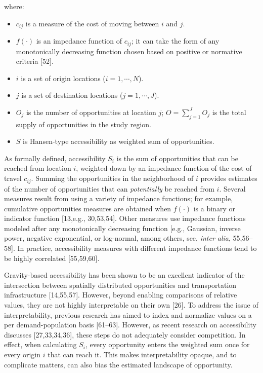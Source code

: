 \documentclass[10pt,letterpaper]{article}
\providecommand{\tightlist}{%
  \setlength{\itemsep}{0pt}\setlength{\parskip}{0pt}}
\begin{document}
\noindent where:

\begin{itemize}
\tightlist
\item
  \(c_{ij}\) is a measure of the cost of moving between \(i\) and \(j\).
\item
  \(f(\cdot)\) is an impedance function of \(c_{ij}\); it can take the
  form of any monotonically decreasing function chosen based on positive
  or normative criteria {[}52{]}.
\item
  \(i\) is a set of origin locations (\(i = 1,\cdots,N\)).
\item
  \(j\) is a set of destination locations (\(j = 1,\cdots,J\)).
\item
  \(O_j\) is the number of opportunities at location \(j\);
  \(O = \sum_{j=1}^J O_j\) is the total supply of opportunities in the
  study region.
\item
  \(S\) is Hansen-type accessibility as weighted sum of opportunities.
\end{itemize}

As formally defined, accessibility \(S_i\) is the sum of opportunities
that can be reached from location \(i\), weighted down by an impedance
function of the cost of travel \(c_{ij}\). Summing the opportunities in
the neighborhood of \(i\) provides estimates of the number of
opportunities that can \emph{potentially} be reached from \(i\). Several
measures result from using a variety of impedance functions; for
example, cumulative opportunities measures are obtained when
\(f(\cdot)\) is a binary or indicator function {[}13,e.g., 30,53,54{]}.
Other measures use impedance functions modeled after any monotonically
decreasing function {[}e.g., Gaussian, inverse power, negative
exponential, or log-normal, among others, see, \emph{inter alia},
55,56--58{]}. In practice, accessibility measures with different
impedance functions tend to be highly correlated {[}55,59,60{]}.

Gravity-based accessibility has been shown to be an excellent indicator
of the intersection between spatially distributed opportunities and
transportation infrastructure {[}14,55,57{]}. However, beyond enabling
comparisons of relative values, they are not highly interpretable on
their own {[}26{]}. To address the issue of interpretability, previous
research has aimed to index and normalize values on a per
demand-population basis {[}61--63{]}. However, as recent research on
accessibility discusses {[}27,33,34,36{]}, these steps do not adequately
consider competition. In effect, when calculating \(S_i\), every
opportunity enters the weighted sum once for every origin \(i\) that can
reach it. This makes interpretability opaque, and to complicate matters,
can also bias the estimated landscape of opportunity.
\end{document}
